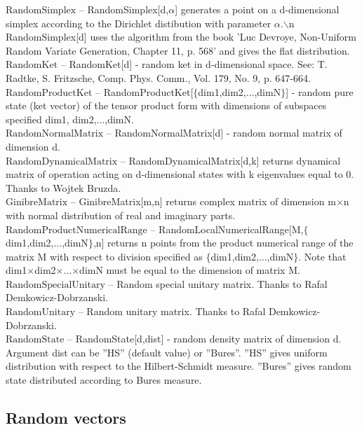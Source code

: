 \noindent\textbf{$ \text{RandomSimplex} $ }-- RandomSimplex[d,$\alpha $] generates a point on a d-dimensional simplex according to the Dirichlet distibution with parameter $\alpha $.$\backslash $n RandomSimplex[d] uses the algorithm from the book 'Luc Devroye, Non-Uniform Random Variate Generation, Chapter 11, p. 568' and gives the flat distribution.$  $\\
\noindent\textbf{$ \text{RandomKet} $ }-- RandomKet[d] - random ket in d-dimensional space. See: T. Radtke, S. Fritzsche, Comp. Phys. Comm., Vol. 179, No. 9, p. 647-664.$  $\\
\noindent\textbf{$ \text{RandomProductKet} $ }-- RandomProductKet[$\{$dim1,dim2,...,dimN$\}$] - random pure state (ket vector) of the tensor product form with dimensions of subspaces specified dim1, dim2,...,dimN.$  $\\
\noindent\textbf{$ \text{RandomNormalMatrix} $ }-- RandomNormalMatrix[d] - random normal matrix of dimension d.$  $\\
\noindent\textbf{$ \text{RandomDynamicalMatrix} $ }-- RandomDynamicalMatrix[d,k] returns dynamical matrix of operation acting on d-dimensional states with k eigenvalues equal to 0. Thanks to Wojtek Bruzda.$  $\\
\noindent\textbf{$ \text{GinibreMatrix} $ }-- GinibreMatrix[m,n] returns complex matrix of dimension m$\times $n with normal distribution of real and imaginary parts.$  $\\
\noindent\textbf{$ \text{RandomProductNumericalRange} $ }-- RandomLocalNumericalRange[M,$\{$dim1,dim2,...,dimN$\}$,n] returns n points from the product numerical range of the matrix M with respect to division specified as $\{$dim1,dim2,...,dimN$\}$. Note that dim1$\times $dim2$\times $...$\times $dimN must be equal to the dimension of matrix M.$  $\\
\noindent\textbf{$ \text{RandomSpecialUnitary} $ }-- Random special unitary matrix. Thanks to Rafal Demkowicz-Dobrzanski.$  $\\
\noindent\textbf{$ \text{RandomUnitary} $ }-- Random unitary matrix. Thanks to Rafal Demkowicz-Dobrzanski.$  $\\
\noindent\textbf{$ \text{RandomState} $ }-- RandomState[d,dist] - random density matrix of dimension d. Argument dist can be ''HS'' (default value) or ''Bures''. ''HS'' gives uniform distribution with respect to the Hilbert-Schmidt measure. ''Bures'' gives random state distributed according to Bures measure.$  $\\
\subsection{Random vectors}


